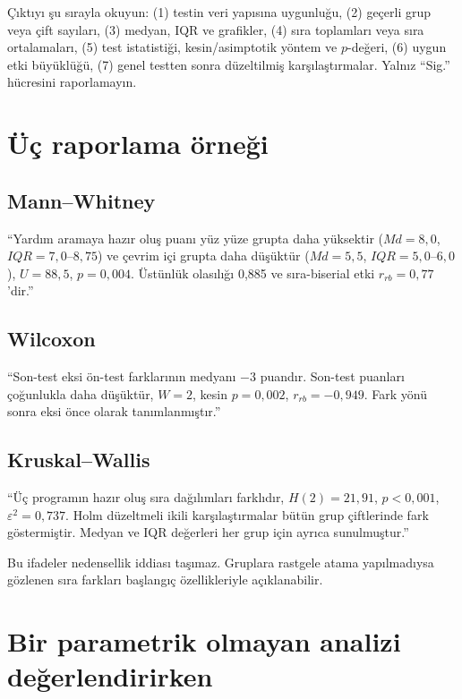 \begin{outputguidebox}
Çıktıyı şu sırayla okuyun: (1) testin veri yapısına uygunluğu, (2) geçerli grup
veya çift sayıları, (3) medyan, IQR ve grafikler, (4) sıra toplamları veya sıra
ortalamaları, (5) test istatistiği, kesin/asimptotik yöntem ve $p$-değeri,
(6) uygun etki büyüklüğü, (7) genel testten sonra düzeltilmiş karşılaştırmalar.
Yalnız ``Sig.'' hücresini raporlamayın.
\end{outputguidebox}

\section{Üç raporlama örneği}

\subsection*{Mann--Whitney}

``Yardım aramaya hazır oluş puanı yüz yüze grupta daha yüksektir
($Md=8{,}0$, $IQR=7{,}0$--$8{,}75$) ve çevrim içi grupta daha düşüktür
($Md=5{,}5$, $IQR=5{,}0$--$6{,}0$), $U=88{,}5$, $p=0{,}004$.
Üstünlük olasılığı 0,885 ve sıra-biserial etki $r_{rb}=0{,}77$'dir.''

\subsection*{Wilcoxon}

``Son-test eksi ön-test farklarının medyanı $-3$ puandır. Son-test puanları
çoğunlukla daha düşüktür, $W=2$, kesin $p=0{,}002$,
$r_{rb}=-0{,}949$. Fark yönü sonra eksi önce olarak tanımlanmıştır.''

\subsection*{Kruskal--Wallis}

``Üç programın hazır oluş sıra dağılımları farklıdır,
$H(2)=21{,}91$, $p<0{,}001$, $\varepsilon^2=0{,}737$. Holm düzeltmeli ikili
karşılaştırmalar bütün grup çiftlerinde fark göstermiştir. Medyan ve IQR
değerleri her grup için ayrıca sunulmuştur.''

Bu ifadeler nedensellik iddiası taşımaz. Gruplara rastgele atama yapılmadıysa
gözlenen sıra farkları başlangıç özellikleriyle açıklanabilir.

\section{Bir parametrik olmayan analizi değerlendirirken}

